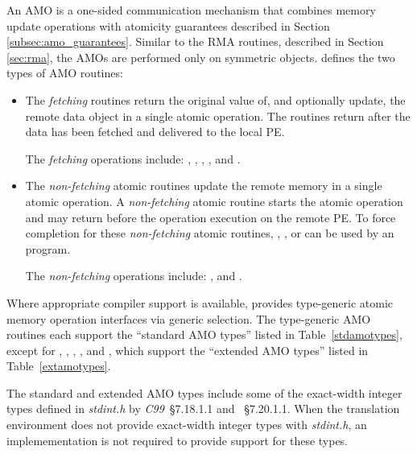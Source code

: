 An \ac{AMO} is a one-sided communication mechanism that combines memory update
operations with atomicity guarantees described in Section
\ref{subsec:amo_guarantees}.  Similar to the \ac{RMA} routines, described in
Section \ref{sec:rma}, the \acp{AMO} are performed only on symmetric objects.
\openshmem{} defines the two types of \ac{AMO} routines:
\begin{itemize}
\item %
The \textit{fetching} routines return the original value of, and optionally
update, the remote data object in a single atomic operation.  The routines 
return after the data has been fetched and delivered to the local \ac{PE}.

The \textit{fetching} operations include: ,
, , , and .

\item %
The \textit{non-fetching} atomic routines update the remote memory in a single
atomic operation.  A \textit{non-fetching} atomic routine starts the atomic
operation and may return before the operation execution on the remote \ac{PE}.
To force completion for these \textit{non-fetching} atomic routines,
, , or  can be
used by an \openshmem{} program. 

The \textit{non-fetching} operations include: ,  and
.
\end{itemize}

Where appropriate compiler support is available, \openshmem{} provides
type-generic atomic memory operation interfaces via \Celev{} generic selection.
The type-generic \ac{AMO} routines each support the ``standard \ac{AMO} types''
listed in Table~\ref{stdamotypes}, except for ,
, , , and
, which support the ``extended \ac{AMO} types'' listed in
Table~\ref{extamotypes}.

The standard and extended \ac{AMO} types include some of the exact-width
integer types defined in \textit{stdint.h} by \textit{C99}~\S7.18.1.1 and
\Celev{}~\S7.20.1.1. When the \Clang{} translation environment
does not provide exact-width integer types with \textit{stdint.h}, an
\openshmem implemementation is not required to provide support for these types.

